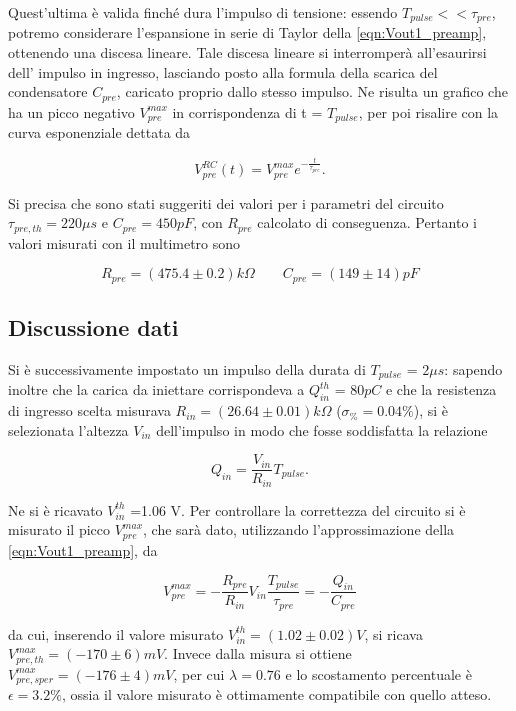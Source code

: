 \documentclass{article}
\begin{document}
Quest'ultima è valida finché dura l'impulso di tensione: essendo $T_{pulse} << \tau_{pre}$, potremo considerare l'espansione in 
serie di Taylor della \ref{eqn:Vout1_preamp}, ottenendo una discesa lineare. Tale discesa lineare si interromperà all'esaurirsi dell'
impulso in ingresso, lasciando posto alla formula della scarica del condensatore $C_{pre}$, caricato proprio dallo stesso impulso.
Ne risulta un grafico che ha un picco negativo $V_{pre}^{max}$ in corrispondenza di t = $T_{pulse}$, per poi risalire con la curva esponenziale
dettata da

\begin{equation}
    \label{eqn:Vout2_preamp}
    V_{pre}^{RC}(t) = V_{pre}^{max}e^{-\frac{t}{\tau_{pre}}}.
\end{equation}

Si precisa che sono stati suggeriti dei valori per i parametri del circuito $\tau_{pre,th} = 220 \mu s$ e $C_{pre} = 450 pF$, con $R_{pre}$ calcolato di 
conseguenza. Pertanto i valori misurati con il multimetro sono

\[
R_{pre} = (475.4 \pm 0.2)k\Omega  \qquad  C_{pre} = (149 \pm 14) pF    
\]

\subsection{Discussione dati}

Si è successivamente impostato un impulso della durata di $T_{pulse}$ = $2 \mu s$: sapendo inoltre che la carica da iniettare 
corrispondeva a $Q_{in}^{th}$ = $80 pC$ e che la resistenza di ingresso scelta misurava $R_{in}=(26.64\pm0.01) k\Omega$ ($\sigma_{\%}=0.04\%$), 
si è selezionata l'altezza $V_{in}$ dell'impulso in modo che fosse soddisfatta la relazione

\begin{equation}
    \label{eqn:Qin}
    Q_{in} = \frac{V_{in}}{R_{in}} T_{pulse}.
\end{equation}

Ne si è ricavato $V_{in}^{th}$ =1.06 V. Per controllare la correttezza del circuito si è misurato il picco $V_{pre}^{max}$, che sarà
dato, utilizzando l'approssimazione della \ref{eqn:Vout1_preamp}, da

\begin{equation}
    \label{eqn:Vpre_max}
    V_{pre}^{max} = -\frac{R_{pre}}{R_{in}} V_{in} \frac{T_{pulse}}{\tau_{pre}} = - \frac{Q_{in}}{C_{pre}}
\end{equation}

da cui, inserendo il valore misurato $V_{in}^{th}=(1.02\pm 0.02) V$, si ricava $V_{pre,th}^{max} =  (-170 \pm 6) mV$. Invece dalla 
misura si ottiene $V_{pre,sper}^{max} = (-176 \pm 4) mV$, per cui $\lambda = 0.76$ e lo scostamento percentuale è $\epsilon = 3.2 \%$, 
ossia il valore misurato è ottimamente compatibile con quello atteso.
\end{document}
